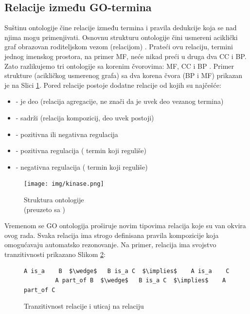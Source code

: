 \subsection{Relacije između GO-termina}

Suštinu ontologije čine relacije između termina i pravila dedukcije koja se nad
njima mogu primenjivati. Osnovnu strukturu ontologije čini usmereni aciklički
graf  obrazovan roditeljskom vezom (relacijom) . Prateći
ovu relaciju, termini jednog imenskog prostora, na primer MF, neće nikad preći u
druga dva CC i BP. Zato razlikujemo tri ontologije sa korenim čvorovima:  MF, CC i BP
\parencite{go_struktura}. Primer strukture (acikličkog usmerenog grafa) sa dva
korena čvora (BP i MF) prikazan je na Slici \ref{fig:kinase}.  Pored relacije
 postoje dodatne relacije od kojih su najčešće:

\begin{itemize}
  \item {}  - je deo  (relacija agregacije, ne znači da je uvek deo vezanog termina)
  \item {} - sadrži (relacija kompozicij, deo uvek postoji)
  \item {} - pozitivna ili negativna regulacija
  \item {} - pozitivna regulacija  
    ( termin koji reguliše)
  \item {} - negativna regulacija 
    ( termin koji reguliše)
\end{itemize}

\begin{figure}[h!]
  \centering
  \texttt{[image: img/kinase.png]}
  \caption{Struktura ontologije\\ \footnotesize (preuzeto sa \parencite{go_veb})}
  \label{fig:kinase}
\end{figure}

Vremenom se GO ontologija proširuje novim tipovima relacija koje su van okvira
ovog rada.  Svaka relacija ima strogo definisana pravila kompozicije koja
omogućavaju automatsko rezonovanje. Na primer, relacija 
ima svojstvo tranzitivnosti \parencite{is_a} prikazano
Slikom \ref{fig:is_a}:
\lstset{
  basicstyle=\ttfamily, mathescape,
  numbers=none
}

\begin{figure}[h!]
  \centering
\begin{lstlisting}[basicstyle=\normalfont]
         A is_a    B  $\wedge$   B is_a C  $\implies$    A is_a    C           
         A part_of B  $\wedge$   B is_a C  $\implies$    A part_of C
\end{lstlisting}
\caption{Tranzitivnost relacije  i uticaj na relaciju }
  \label{fig:is_a}
\end{figure}


